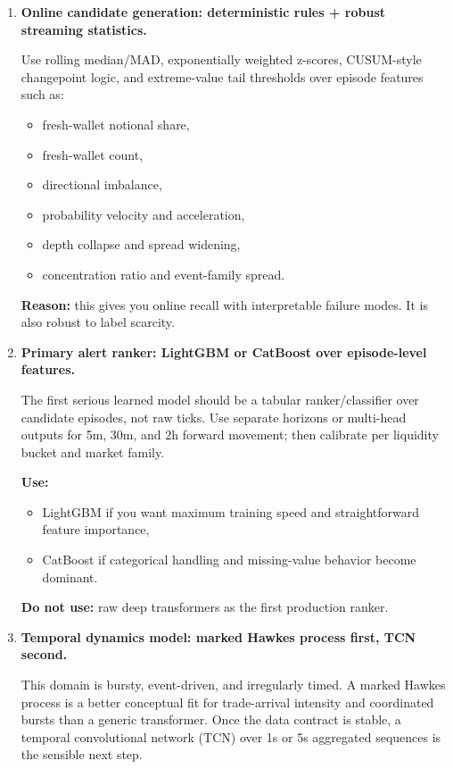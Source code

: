\documentclass[11pt,letterpaper]{article}
\begin{document}
\begin{enumerate}[leftmargin=1.5em]
    \item \textbf{Online candidate generation: deterministic rules + robust streaming statistics.}

    Use rolling median/MAD, exponentially weighted z-scores, CUSUM-style changepoint logic, and extreme-value tail thresholds over episode features such as:
    \begin{itemize}[nosep]
        \item fresh-wallet notional share,
        \item fresh-wallet count,
        \item directional imbalance,
        \item probability velocity and acceleration,
        \item depth collapse and spread widening,
        \item concentration ratio and event-family spread.
    \end{itemize}

    \textbf{Reason:} this gives you online recall with interpretable failure modes. It is also robust to label scarcity.

    \item \textbf{Primary alert ranker: LightGBM or CatBoost over episode-level features.}

    The first serious learned model should be a tabular ranker/classifier over candidate episodes, not raw ticks. Use separate horizons or multi-head outputs for 5m, 30m, and 2h forward movement; then calibrate per liquidity bucket and market family.

    \textbf{Use:}
    \begin{itemize}[nosep]
        \item LightGBM if you want maximum training speed and straightforward feature importance,
        \item CatBoost if categorical handling and missing-value behavior become dominant.
    \end{itemize}

    \textbf{Do not use:} raw deep transformers as the first production ranker.

    \item \textbf{Temporal dynamics model: marked Hawkes process first, TCN second.}

    This domain is bursty, event-driven, and irregularly timed. A marked Hawkes process is a better conceptual fit for trade-arrival intensity and coordinated bursts than a generic transformer. Once the data contract is stable, a temporal convolutional network (TCN) over 1s or 5s aggregated sequences is the sensible next step.


\end{enumerate}
\end{document}
